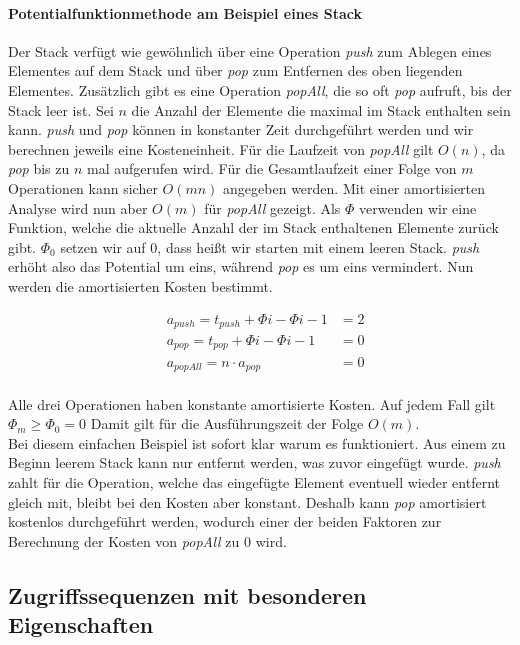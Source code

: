 \documentclass[a4paper,12pt]{article}
\begin{document}
\paragraph{Potentialfunktionmethode am Beispiel eines Stack} 
Der Stack verfügt wie gewöhnlich über eine Operation \textit{push} zum Ablegen eines Elementes auf dem Stack und über \textit{pop} zum Entfernen des oben liegenden Elementes. Zusätzlich gibt es eine Operation \textit{popAll}, die so oft \textit{pop} aufruft, bis der Stack leer ist. Sei $n$ die Anzahl der Elemente die maximal im Stack enthalten sein kann. \textit{push} und \textit{pop} können in konstanter Zeit durchgeführt werden und wir berechnen jeweils eine Kosteneinheit. Für die Laufzeit von \textit{popAll} gilt $O(n)$, da \textit{pop} bis zu $n$ mal aufgerufen wird. Für die Gesamtlaufzeit einer Folge von $m$ Operationen kann sicher $O(mn)$ angegeben werden. Mit einer amortisierten Analyse wird nun aber $O(m)$ für \textit{popAll} gezeigt. Als $\Phi$ verwenden wir eine Funktion, welche die aktuelle Anzahl der im Stack enthaltenen Elemente zurück gibt. $\Phi_0$ setzen wir auf $0$, dass heißt wir starten mit einem leeren Stack. \textit{push} erhöht also das Potential um eins, während \textit{pop} es um eins vermindert. Nun werden die amortisierten Kosten bestimmt. 

\begin{align*}   
&a_{\mathit{push}} = t_{\mathit{push}} + \Phi{i} - \Phi{i-1}  &= 2\\
&a_{\mathit{pop}} = t_{\mathit{pop}} + \Phi{i} - \Phi{i-1}  &= 0\\
&a_{\mathit{popAll}} = n \cdot a_{\mathit{pop}} &= 0
\end{align*}\\
Alle drei Operationen haben konstante amortisierte Kosten. Auf jedem Fall gilt $ \Phi_m \geq  \Phi_0 = 0 $ Damit gilt für die Ausführungszeit der Folge $O(m)$. \\
Bei diesem einfachen Beispiel ist sofort klar warum es funktioniert. Aus einem zu Beginn leerem Stack kann nur entfernt werden, was zuvor eingefügt wurde. \textit{push} zahlt für die Operation, welche das eingefügte Element eventuell wieder entfernt gleich mit, bleibt bei den Kosten aber konstant. Deshalb kann \textit{pop} amortisiert kostenlos durchgeführt werden, wodurch einer der beiden Faktoren zur Berechnung der Kosten von \textit{popAll} zu $0$ wird.  
\subsection{Zugriffssequenzen mit besonderen Eigenschaften }

\newpage


\end{document}
